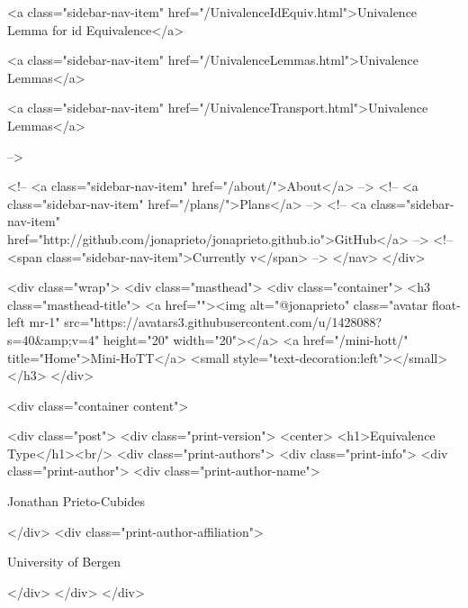       
    
      
        
          <a class="sidebar-nav-item" href="/UnivalenceIdEquiv.html">Univalence Lemma for id Equivalence</a>
        
      
    
      
        
          <a class="sidebar-nav-item" href="/UnivalenceLemmas.html">Univalence Lemmas</a>
        
      
    
      
        
          <a class="sidebar-nav-item" href="/UnivalenceTransport.html">Univalence Lemmas</a>
        
      
     -->

    <!-- <a class="sidebar-nav-item" href="/about/">About</a> -->
    <!-- <a class="sidebar-nav-item" href="/plans/">Plans</a> -->
    <!-- <a class="sidebar-nav-item" href="http://github.com/jonaprieto/jonaprieto.github.io">GitHub</a> -->
    <!-- <span class="sidebar-nav-item">Currently v</span> -->
  </nav>
</div>

    <div class="wrap">
      <div class="masthead">
        <div class="container">
          <h3 class="masthead-title">
            <a href=""><img alt="@jonaprieto" class="avatar float-left mr-1" src="https://avatars3.githubusercontent.com/u/1428088?s=40&amp;v=4" height="20" width="20"></a>
            <a href="/mini-hott/" title="Home">Mini-HoTT</a>
            <small style="text-decoration:left"></small>
          </h3>
        </div>
      
      <div class="container content">
        







<div class="post">
  <div class="print-version">
    <center>
      <h1>Equivalence Type</h1><br/>
        <div class="print-authors">
          <div class="print-info">
            <div class="print-author">
              <div class="print-author-name">
                
                  Jonathan Prieto-Cubides
                
              </div>
              <div class="print-author-affiliation">
                
                  University of Bergen
                
                </div>
            </div>
          </div>
          
